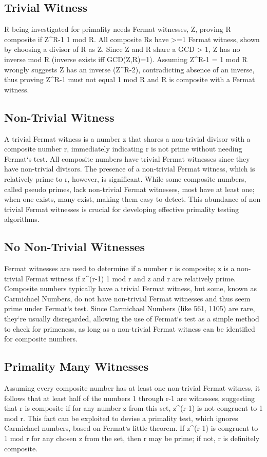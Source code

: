 \subsection*{Trivial Witness}
R being investigated for primality needs Fermat witnesses, Z, proving R composite if Z\textasciicircum{}R-1  1 mod R\@.
All composite Rs have \textgreater{}=1 Fermat witness, shown by choosing a divisor of R as Z\@.
Since Z and R share a GCD \textgreater{} 1, Z has no inverse mod R (inverse exists iff GCD(Z,R)=1).
Assuming Z\textasciicircum{}R-1 = 1 mod R wrongly suggests Z has an inverse (Z\textasciicircum{}R-2), contradicting absence of an inverse, thus proving Z\textasciicircum{}R-1 must not equal 1 mod R and R is composite with a Fermat witness.

\subsection*{Non-Trivial Witness}
A trivial Fermat witness is a number z that shares a non-trivial divisor with a composite number r, immediately indicating r is not prime without needing Fermat`s test.
All composite numbers have trivial Fermat witnesses since they have non-trivial divisors.
The presence of a non-trivial Fermat witness, which is relatively prime to r, however, is significant.
While some composite numbers, called pseudo primes, lack non-trivial Fermat witnesses, most have at least one; when one exists, many exist, making them easy to detect.
This abundance of non-trivial Fermat witnesses is crucial for developing effective primality testing algorithms.

\subsection*{No Non-Trivial Witnesses}
Fermat witnesses are used to determine if a number r is composite; z is a non-trivial Fermat witness if z\textasciicircum{}(r-1)  1 mod r and z and r are relatively prime.
Composite numbers typically have a trivial Fermat witness, but some, known as Carmichael Numbers, do not have non-trivial Fermat witnesses and thus seem prime under Fermat`s test.
Since Carmichael Numbers (like 561, 1105) are rare, they`re usually disregarded, allowing the use of Fermat`s test as a simple method to check for primeness, as long as a non-trivial Fermat witness can be identified for composite numbers.

\subsection*{Primality  Many Witnesses}
Assuming every composite number has at least one non-trivial Fermat witness, it follows that at least half of the numbers 1 through r-1 are witnesses, suggesting that r is composite if for any number z from this set, z\textasciicircum{}(r-1) is not congruent to 1 mod r.
This fact can be exploited to devise a primality test, which ignores Carmichael numbers, based on Fermat`s little theorem.
If z\textasciicircum{}(r-1) is congruent to 1 mod r for any chosen z from the set, then r may be prime; if not, r is definitely composite.

